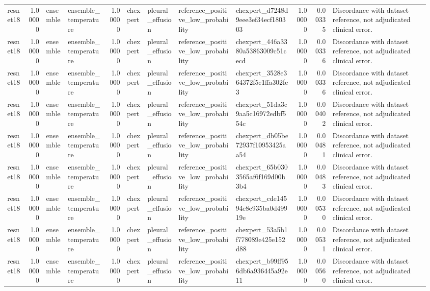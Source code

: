 \begin{tabular}{lrllrllllrrl}
resnet18 & 1.00000 & ensemble & ensemble\_temperature & 1.00000 & chexpert & pleural\_effusion & reference\_positive\_low\_probability & chexpert\_d7248d9eee3ef34ecf180303 & 1.00000 & 0.00335 & Discordance with dataset reference, not adjudicated clinical error. \\
resnet18 & 1.00000 & ensemble & ensemble\_temperature & 1.00000 & chexpert & pleural\_effusion & reference\_positive\_low\_probability & chexpert\_446a3380a53863009c51cecd & 1.00000 & 0.00336 & Discordance with dataset reference, not adjudicated clinical error. \\
resnet18 & 1.00000 & ensemble & ensemble\_temperature & 1.00000 & chexpert & pleural\_effusion & reference\_positive\_low\_probability & chexpert\_3528e364372f5e1ffa302fe3 & 1.00000 & 0.00336 & Discordance with dataset reference, not adjudicated clinical error. \\
resnet18 & 1.00000 & ensemble & ensemble\_temperature & 1.00000 & chexpert & pleural\_effusion & reference\_positive\_low\_probability & chexpert\_51da3c9aa5c16972edbf554c & 1.00000 & 0.00402 & Discordance with dataset reference, not adjudicated clinical error. \\
resnet18 & 1.00000 & ensemble & ensemble\_temperature & 1.00000 & chexpert & pleural\_effusion & reference\_positive\_low\_probability & chexpert\_db05be72937f10953425aa54 & 1.00000 & 0.00481 & Discordance with dataset reference, not adjudicated clinical error. \\
resnet18 & 1.00000 & ensemble & ensemble\_temperature & 1.00000 & chexpert & pleural\_effusion & reference\_positive\_low\_probability & chexpert\_65b0303565af6f169d00b3b4 & 1.00000 & 0.00483 & Discordance with dataset reference, not adjudicated clinical error. \\
resnet18 & 1.00000 & ensemble & ensemble\_temperature & 1.00000 & chexpert & pleural\_effusion & reference\_positive\_low\_probability & chexpert\_cde14594e8e935ba0d49919e & 1.00000 & 0.00530 & Discordance with dataset reference, not adjudicated clinical error. \\
resnet18 & 1.00000 & ensemble & ensemble\_temperature & 1.00000 & chexpert & pleural\_effusion & reference\_positive\_low\_probability & chexpert\_53a5b1f778089e425e152d88 & 1.00000 & 0.00531 & Discordance with dataset reference, not adjudicated clinical error. \\
resnet18 & 1.00000 & ensemble & ensemble\_temperature & 1.00000 & chexpert & pleural\_effusion & reference\_positive\_low\_probability & chexpert\_b99ff956db6a936445a92e11 & 1.00000 & 0.00560 & Discordance with dataset reference, not adjudicated clinical error. \\

\end{tabular}
